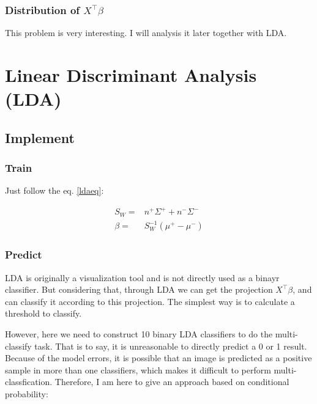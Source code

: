 \documentclass{article}
\begin{document}
\subsubsection{Distribution of $X^\top\beta$}
This problem is very interesting. I will analysis it later together with LDA.

\section{Linear Discriminant Analysis (LDA)}
\subsection{Implement}
\subsubsection{Train}
Just follow the eq. \ref{ldaeq}:
\begin{spacing}{1.5}
\begin{equation}
    \label{ldaeq}
    \begin{array}{rl}
        S_W =& n^+\Sigma^+ + n^-\Sigma^-\\
        \beta =& S^{-1}_W (\mu^+-\mu^-)
    \end{array}
\end{equation}
\end{spacing}
\subsubsection{Predict}
LDA is originally a visualization tool and is not directly used as a binayr classifier. But considering that, through LDA we can get the projection $X^\top\beta$, and can classify it according to this projection. 
The simplest way is to calculate a threshold to classify. 

However, here we need to construct 10 binary LDA classifiers to do the multi-classify task. That is to say, it is unreasonable to directly predict a 0 or 1 result. Because of the model errors, it is possible that an image is predicted 
as a positive sample in more than one classifiers, which makes it difficult to perform multi-classfication. Therefore, I am here to give an approach based on conditional probability:
\end{document}
